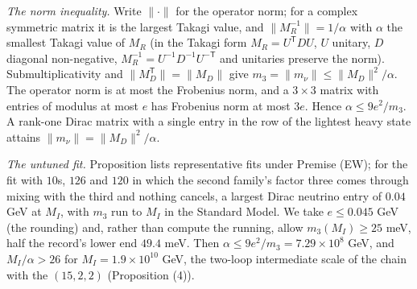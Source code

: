 \emph{The norm inequality.} Write $\lVert\cdot\rVert$ for the operator norm; for a complex symmetric matrix it is the largest Takagi value, and $\lVert M_{R}^{-1}\rVert = 1/\alpha$ with $\alpha$ the smallest Takagi value of $M_{R}$ (in the Takagi form $M_{R} = U^{\mathsf{T}}DU$, $U$ unitary, $D$ diagonal non-negative, $M_{R}^{-1} = U^{-1}D^{-1}U^{-\mathsf{T}}$ and unitaries preserve the norm). Submultiplicativity and $\lVert M_{D}^{\mathsf{T}}\rVert = \lVert M_{D}\rVert$ give $m_{3} = \lVert m_{\nu}\rVert \le \lVert M_{D}\rVert^{2}/\alpha$. The operator norm is at most the Frobenius norm, and a $3 \times 3$ matrix with entries of modulus at most $e$ has Frobenius norm at most $3e$. Hence $\alpha \le 9e^{2}/m_{3}$. A rank-one Dirac matrix with a single entry in the row of the lightest heavy state attains $\lVert m_{\nu}\rVert = \lVert M_{D}\rVert^{2}/\alpha$.

\emph{The untuned fit.} Proposition  lists representative fits under Premise (EW); for the fit with $10$s, $126$ and $120$ in which the second family's factor three comes through mixing with the third and nothing cancels, a largest Dirac neutrino entry of $0.04$ GeV at $M_{I}$, with $m_{3}$ run to $M_{I}$ in the Standard Model. We take $e \le 0.045$ GeV (the rounding) and, rather than compute the running, allow $m_{3}(M_{I}) \ge 25$ meV, half the record's lower end $49.4$ meV. Then $\alpha \le 9e^{2}/m_{3} = 7.29 \times 10^{8}$ GeV, and $M_{I}/\alpha > 26$ for $M_{I} = 1.9 \times 10^{10}$ GeV, the two-loop intermediate scale of the chain with the $(15,2,2)$ (Proposition (4)).

